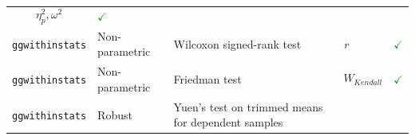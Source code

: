 \documentclass[]{article}
\begin{document}
\begin{longtable}[]{@{}lllll@{}}
\begin{minipage}[t]{0.12\columnwidth}
\[\eta^2_p, \omega^2\]\strut
\end{minipage} & \begin{minipage}[t]{0.07\columnwidth}\raggedright
\textcolor{ForestGreen}{$\checkmark$}\strut
\end{minipage}\tabularnewline
\begin{minipage}[t]{0.20\columnwidth}\raggedright
\texttt{ggwithinstats}\strut
\end{minipage} & \begin{minipage}[t]{0.16\columnwidth}\raggedright
Non-parametric\strut
\end{minipage} & \begin{minipage}[t]{0.31\columnwidth}\raggedright
Wilcoxon signed-rank test\strut
\end{minipage} & \begin{minipage}[t]{0.12\columnwidth}\raggedright
\emph{r}\strut
\end{minipage} & \begin{minipage}[t]{0.07\columnwidth}\raggedright
\textcolor{ForestGreen}{$\checkmark$}\strut
\end{minipage}\tabularnewline
\begin{minipage}[t]{0.20\columnwidth}\raggedright
\texttt{ggwithinstats}\strut
\end{minipage} & \begin{minipage}[t]{0.16\columnwidth}\raggedright
Non-parametric\strut
\end{minipage} & \begin{minipage}[t]{0.31\columnwidth}\raggedright
Friedman test\strut
\end{minipage} & \begin{minipage}[t]{0.12\columnwidth}\raggedright
\[W_{Kendall}\]\strut
\end{minipage} & \begin{minipage}[t]{0.07\columnwidth}\raggedright
\textcolor{ForestGreen}{$\checkmark$}\strut
\end{minipage}\tabularnewline
\begin{minipage}[t]{0.20\columnwidth}\raggedright
\texttt{ggwithinstats}\strut
\end{minipage} & \begin{minipage}[t]{0.16\columnwidth}\raggedright
Robust\strut
\end{minipage} & \begin{minipage}[t]{0.31\columnwidth}\raggedright
Yuen's test on trimmed means for dependent samples\strut
\end{minipage} & \begin{minipage}[t]{0.12\columnwidth}\raggedright

\end{minipage}
\end{longtable}
\end{document}
